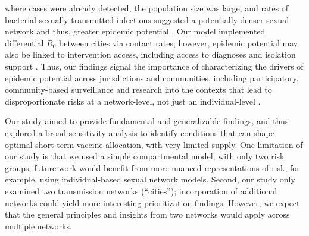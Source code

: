 where cases were already detected, the population size was large, and
rates of bacterial sexually transmitted infections suggested
a potentially denser sexual network and thus, greater epidemic potential \cite{Endo2022}.
Our model implemented differential $R_0$ between cities via contact rates;
however, epidemic potential may also be linked to intervention access,
including access to diagnoses and isolation support \cite{Millett2012,Cevik2021supp}.
Thus, our findings signal the importance of characterizing
the drivers of epidemic potential across jurisdictions and communities,
including participatory, community-based surveillance and research
into the contexts that lead to disproportionate risks at a network-level,
not just an individual-level \cite{Baral2013,Cevik2021net}.
\par
Our study aimed to provide fundamental and generalizable findings, and thus
explored a broad sensitivity analysis to identify conditions that can shape
optimal short-term vaccine allocation, with very limited supply.
One limitation of our study is that
we used a simple compartmental model, with only two risk groups;
future work would benefit from more nuanced representations of risk,
for example, using individual-based sexual network models.
Second, our study only examined two transmission networks (``cities'');
incorporation of additional networks could yield more interesting prioritization findings.
However, we expect that the general principles and insights from two networks
would apply across multiple networks.
